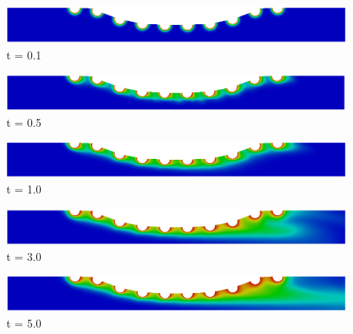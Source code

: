 \begin{figure}[H]
     \begin{minipage}{.50\linewidth}
      \centering
      \includegraphics[scale=0.18]{./02_chaps/cap_solution/figure/conc1_CurvedStrut1.png}\\
      t = 0.1
     \end{minipage}%
     \begin{minipage}{.50\linewidth}
      \centering
      \includegraphics[scale=0.18]{./02_chaps/cap_solution/figure/conc1_CurvedStrut2.png}\\
      t = 0.5
     \end{minipage}
     \begin{minipage}{.50\linewidth}
     \medskip
      \centering
      \includegraphics[scale=0.18]{./02_chaps/cap_solution/figure/conc1_CurvedStrut3.png}\\
      t = 1.0
     \end{minipage}%
     \begin{minipage}{.50\linewidth}
     \medskip
      \centering
      \includegraphics[scale=0.18]{./02_chaps/cap_solution/figure/conc1_CurvedStrut4.png}\\
      t = 3.0
     \end{minipage}
     \begin{minipage}{.50\linewidth}
      \centering
      \includegraphics[scale=0.18]{./02_chaps/cap_solution/figure/conc1_CurvedStrut5.png}\\
      t = 5.0
     \end{minipage}%

\end{figure}
